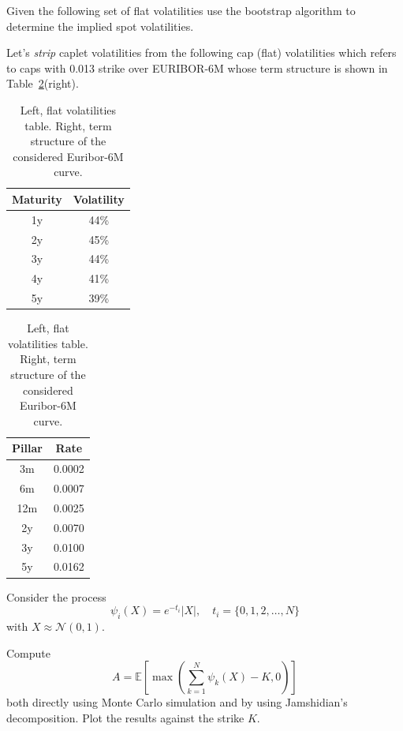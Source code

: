 \documentclass[12pt,a4paper]{book}
\begin{document}
\begin{exercise}[subtitle=Cap Volatilities (\texttt{python})]
Given the following set of flat volatilities use the bootstrap algorithm to determine the implied spot volatilities.

Let's \emph{strip} caplet volatilities from the following cap (flat) volatilities which refers to caps with 0.013 strike over EURIBOR-6M whose term structure is shown in Table~\ref{tab:flat_volatilities}(right).

\begin{table}[htpb]
\begin{center}
\renewcommand{\arraystretch}{2}
\begin{tabular}{|c|c|}
\hline
Maturity & Volatility \\ \hline
1y & 44\% \\ \hline
2y & 45\% \\ \hline
3y & 44\% \\ \hline
4y & 41\% \\ \hline
5y & 39\% \\ \hline
\end{tabular}
\quad
\begin{tabular}{|c|c|}
\hline
Pillar & Rate \\ \hline
3m & 0.0002 \\ \hline
6m & 0.0007 \\ \hline
12m & 0.0025 \\ \hline
2y  & 0.0070 \\ \hline
3y & 0.0100 \\ \hline
5y & 0.0162 \\ \hline
\end{tabular}
\end{center}
\label{tab:flat_volatilities}
\caption{Left, flat volatilities table. Right, term structure of the considered Euribor-6M curve.}
\end{table}
\end{exercise}

\begin{exercise}[subtitle=Jamshidian Trick (\texttt{python})]
Consider the process 
\begin{equation*}
\psi_i(X)=e^{-t_i}|X|,\quad t_i=\{0,1,2,\ldots, N\}
\end{equation*}
with $X\approx\mathcal{N}(0,1)$.

Compute 
\begin{equation*}
A = \mathbb{E}\left[\max\left(\sum_{k=1}^N \psi_k(X) - K, 0\right)\right]
\end{equation*}
both directly using Monte Carlo simulation and by using Jamshidian's decomposition.
Plot the results against the strike $K$.
\end{exercise}
\end{document}
